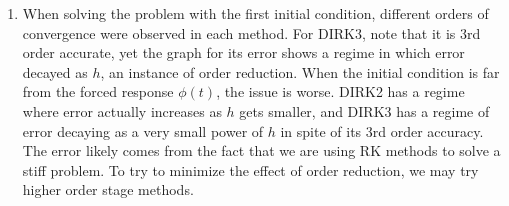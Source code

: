 \documentclass{article}
\newcommand{\sep}[1][.5cm]{\vspace{#1}}
\begin{document}
\begin{enumerate}[label=(\alph*)]
\item When solving the problem with the first initial condition, different orders of convergence were observed in each method. For DIRK3, note that it is 3rd order accurate, yet the graph for its error shows a regime in which error decayed as $h$, an instance of order reduction. When the initial condition is far from the forced response $\phi(t)$, the issue is worse. DIRK2 has a regime where error actually increases as $h$ gets smaller, and DIRK3 has a regime of error decaying as a very small power of $h$ in spite of its 3rd order accuracy. The error likely comes from the fact that we are using RK methods to solve a stiff problem. To try to minimize the effect of order reduction, we may try higher order stage methods.

\end{enumerate}
\sep
\end{document}

